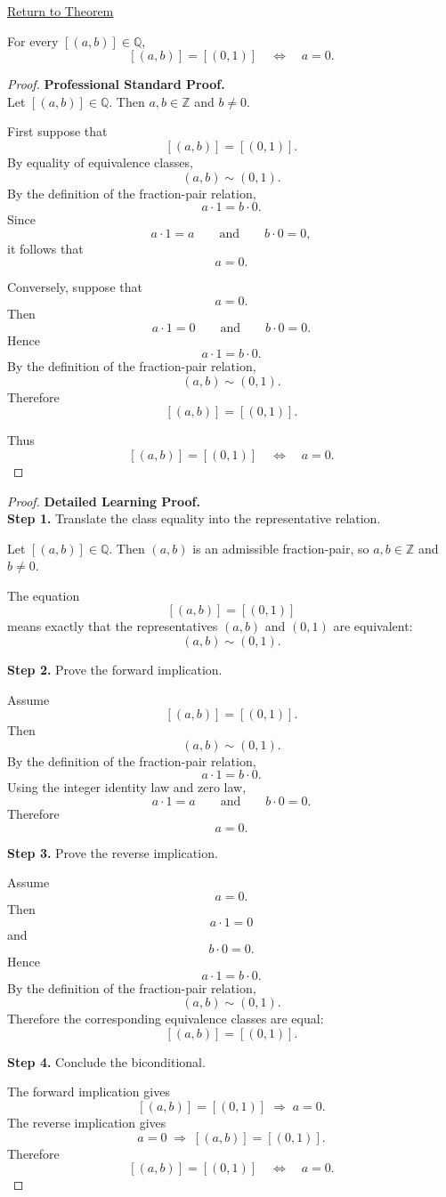 \newpage
{}
\label{prf:ec-zero-numerator}

\begin{remark*}[Return]
\hyperref[thm:ec-zero-numerator]{Return to Theorem}
\end{remark*}

\begin{theorem*}
For every $[(a,b)]\in\mathbb{Q}$,
\[
[(a,b)] = [(0,1)]
\quad\Longleftrightarrow\quad
a = 0.
\]
\end{theorem*}

\begin{proof}
\textbf{Professional Standard Proof.}~\\
Let $[(a,b)]\in\mathbb{Q}$. Then $a,b\in\mathbb{Z}$ and $b\neq 0$.

First suppose that
\[
[(a,b)] = [(0,1)].
\]
By equality of equivalence classes,
\[
(a,b)\sim(0,1).
\]
By the definition of the fraction-pair relation,
\[
a\cdot 1=b\cdot 0.
\]
Since
\[
a\cdot 1=a
\qquad\text{and}\qquad
b\cdot 0=0,
\]
it follows that
\[
a=0.
\]

Conversely, suppose that
\[
a=0.
\]
Then
\[
a\cdot 1=0
\qquad\text{and}\qquad
b\cdot 0=0.
\]
Hence
\[
a\cdot 1=b\cdot 0.
\]
By the definition of the fraction-pair relation,
\[
(a,b)\sim(0,1).
\]
Therefore
\[
[(a,b)] = [(0,1)].
\]

Thus
\[
[(a,b)] = [(0,1)]
\quad\Longleftrightarrow\quad
a=0.
\]
\end{proof}

\begin{proof}
\textbf{Detailed Learning Proof.}~\\

\textbf{Step 1.} Translate the class equality into the representative relation.

Let $[(a,b)]\in\mathbb{Q}$. Then $(a,b)$ is an admissible fraction-pair,
so $a,b\in\mathbb{Z}$ and $b\neq 0$.

The equation
\[
[(a,b)] = [(0,1)]
\]
means exactly that the representatives $(a,b)$ and $(0,1)$ are equivalent:
\[
(a,b)\sim(0,1).
\]

\textbf{Step 2.} Prove the forward implication.

Assume
\[
[(a,b)] = [(0,1)].
\]
Then
\[
(a,b)\sim(0,1).
\]
By the definition of the fraction-pair relation,
\[
a\cdot 1=b\cdot 0.
\]
Using the integer identity law and zero law,
\[
a\cdot 1=a
\qquad\text{and}\qquad
b\cdot 0=0.
\]
Therefore
\[
a=0.
\]

\textbf{Step 3.} Prove the reverse implication.

Assume
\[
a=0.
\]
Then
\[
a\cdot 1=0
\]
and
\[
b\cdot 0=0.
\]
Hence
\[
a\cdot 1=b\cdot 0.
\]
By the definition of the fraction-pair relation,
\[
(a,b)\sim(0,1).
\]
Therefore the corresponding equivalence classes are equal:
\[
[(a,b)] = [(0,1)].
\]

\textbf{Step 4.} Conclude the biconditional.

The forward implication gives
\[
[(a,b)] = [(0,1)] \;\Longrightarrow\; a=0.
\]
The reverse implication gives
\[
a=0 \;\Longrightarrow\; [(a,b)] = [(0,1)].
\]
Therefore
\[
[(a,b)] = [(0,1)]
\quad\Longleftrightarrow\quad
a=0.
\]
\end{proof}


